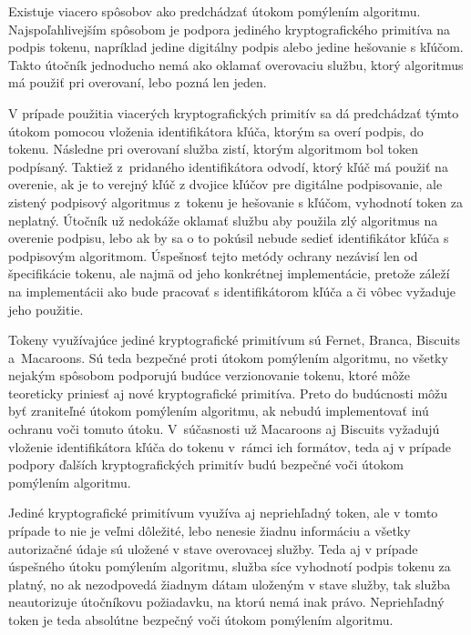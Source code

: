 Existuje viacero spôsobov ako predchádzať útokom pomýlením algoritmu. Najspoľahlivejším spôsobom je podpora jediného kryptografického primitíva na podpis tokenu, napríklad jedine digitálny podpis alebo jedine hešovanie s kľúčom. Takto útočník jednoducho nemá ako oklamať overovaciu službu, ktorý algoritmus má použiť pri overovaní, lebo pozná len jeden. 

V prípade použitia viacerých kryptografických primitív sa dá predchádzať týmto útokom pomocou vloženia identifikátora kľúča, ktorým sa overí podpis, do tokenu. Následne pri overovaní služba zistí, ktorým algoritmom bol token podpísaný. Taktiež z~pridaného identifikátora odvodí, ktorý kľúč má použiť na overenie, ak je to verejný kľúč z dvojice kľúčov pre digitálne podpisovanie, ale zistený podpisový algoritmus z~tokenu je hešovanie s kľúčom, vyhodnotí token za neplatný. Útočník už nedokáže oklamať službu aby použila zlý algoritmus na overenie podpisu, lebo ak by sa o to pokúsil nebude sedieť identifikátor kľúča s podpisovým algoritmom. Úspešnosť tejto metódy ochrany nezávisí len od špecifikácie tokenu, ale najmä od jeho konkrétnej implementácie, pretože záleží na implementácii ako bude pracovať s identifikátorom kľúča a či vôbec vyžaduje jeho použitie.

Tokeny využívajúce jediné kryptografické primitívum sú Fernet, Branca, Biscuits a~Macaroons. Sú teda bezpečné proti útokom pomýlením algoritmu, no všetky nejakým spôsobom podporujú budúce verzionovanie tokenu, ktoré môže teoreticky priniesť aj nové kryptografické primitíva. Preto do budúcnosti môžu byť zraniteľné útokom pomýlením algoritmu, ak nebudú implementovať inú ochranu voči tomuto útoku. V~súčasnosti už Macaroons aj Biscuits vyžadujú vloženie identifikátora kľúča do tokenu v~rámci ich formátov, teda aj v prípade podpory ďalších kryptografických primitív budú bezpečné voči útokom pomýlením algoritmu.

Jediné kryptografické primitívum využíva aj nepriehľadný token, ale v tomto prípade to nie je veľmi dôležité, lebo nenesie žiadnu informáciu a všetky autorizačné údaje sú uložené v stave overovacej služby. Teda aj v prípade úspešného útoku pomýlením algoritmu, služba síce vyhodnotí podpis tokenu za platný, no ak nezodpovedá žiadnym dátam uloženým v stave služby, tak služba neautorizuje útočníkovu požiadavku, na ktorú nemá inak právo. Nepriehľadný token je teda absolútne bezpečný voči útokom pomýlením algoritmu.

